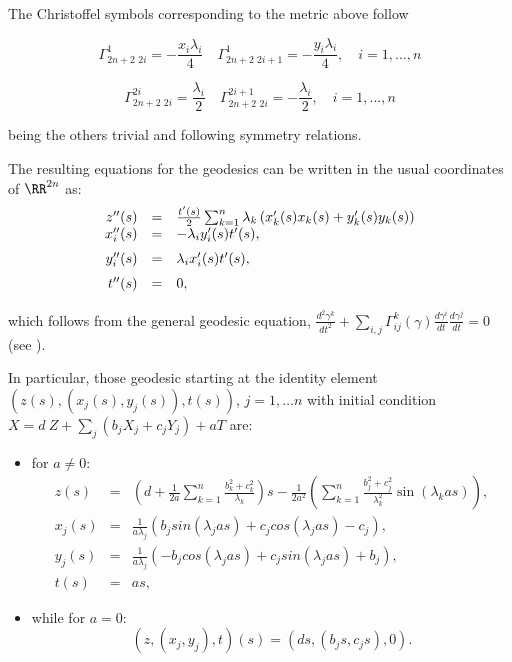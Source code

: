 \documentclass[11pt]{amsart}
\theoremstyle{plain}
\theoremstyle{definition}
\theoremstyle{remark}
\begin{document}
	The Christoffel symbols corresponding to the metric above follow
	
	\[ \Gamma^1_{2n+2 \,\, 2i}=-\frac{x_{i} \lambda_{i}}{4} \quad \Gamma^1_{2n+2 \,\, 2i+1}=-\frac{y_{i} \lambda_{i}}{4}, \quad i=1,..., n \]
	
	\[ \Gamma^{2i}_{2n+2 \,\, 2i}=\frac{\lambda_i}{2} \quad \Gamma^{2i+1}_{2n+2 \,\, 2i}=-\frac{\lambda_i}{2}, \quad i=1,..., n \]
	
	being the others trivial and following  symmetry relations. 
	
	The resulting equations for the geodesics can be written in the usual  coordinates of $\RR^{2n}$ as:
	\begin{equation}\label{geodcomp}
		\begin{array}{rcl}
			z''(s)&= & \frac{ t'(s)}{2}\sum_{k=1}^{n}  \lambda_k \left( x_k'(s) x_k(s)+y_k'(s) y_k(s) \right) \\ \vspace{.2cm}
			x_i''(s)&=&-\lambda_i y_i'(s) t'(s),\\ \vspace{.2cm}
			y_i''(s)&=&\lambda_i x_i'(s) t'(s),\\ \vspace{.2cm}
			t''(s)&=&0,
		\end{array}
	\end{equation}
		which follows from the general geodesic equation, $\frac{d^2 \gamma^k}{d t^2} + \sum_{i,j} \Gamma^k_{i j}(\gamma) \frac{d \gamma^i}{dt} \frac{d \gamma^j}{dt} = 0$ (see \cite{ON}).
	
	
	
	In particular, those geodesic starting at the identity element $(z(s), (x_j(s),y_j(s)),t(s))$, $j=1, \hdots n$ with initial condition $X =  d \ Z + \sum_j (b_j X_j + c_j Y_j) + a T$ are:
	
	\begin{itemize}
		\item for $a \neq 0$:
			\begin{eqnarray} \label{geo_osc_1}
			z(s)&= & \left(d + \frac{1}{2 a} \sum_{k=1}^{n} \frac{ b_{k}^{2}+c_k^{2}}{\lambda_k}\right)s- \frac{1}{2 a^{2}} \left(  \sum_{k=1}^{n} \frac{b_{j}^{2}+c_j^2}{\lambda_k^{2}} \sin(\lambda_k a s) \right),\\
			x_j(s)&=&  \frac{1}{a \lambda_j} \left(   {b_j}sin(\lambda_j a s)+{c_j}cos(\lambda_j a s)-{c_j} \right),\\
			y_j(s)&=&  \frac{1}{a \lambda_j}  \left(    -{b_j}cos(\lambda_j a s)+{c_j} sin(\lambda_j a s)+{b_j} \right),\\ 
			t(s)&=&a s,
		\end{eqnarray}
		\item while for $a=0$:
		\begin{equation}\label{geo2}
			(z,(x_j,y_j),t)(s)=(ds,(b_j s,c_j s),0). 
		\end{equation}
		
	\end{itemize}
	
\end{document}
